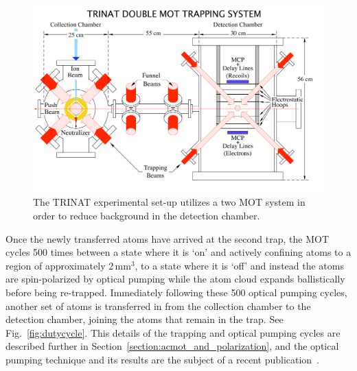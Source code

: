 \begin{figure}[t!h]
	\centering
	\includegraphics[width=.999\linewidth]
	{Figures/doublemot4.pdf}
	\caption{The TRINAT experimental set-up utilizes a two MOT system in order to reduce background in the detection chamber.}	
	\label{fig:doublemot}
\end{figure}

Once the newly transferred atoms have arrived at the second trap, the MOT cycles 500 times between a state where it is `on' and actively confining atoms to a region of approximately 2\,mm$^3$, to a state where it is `off' and instead the atoms are spin-polarized by optical pumping while the atom cloud expands ballistically before being re-trapped.  Immediately following these 500 optical pumping cycles, another set of atoms is transferred in from the collection chamber to the detection chamber, joining the atoms that remain in the trap.  See Fig.~\ref{fig:dutycycle}.  This details of the trapping and optical pumping cycles are described further in Section~\ref{section:acmot_and_polarization}, and the optical pumping technique and its results are the subject of a recent publication~\cite{ben_OP}.

